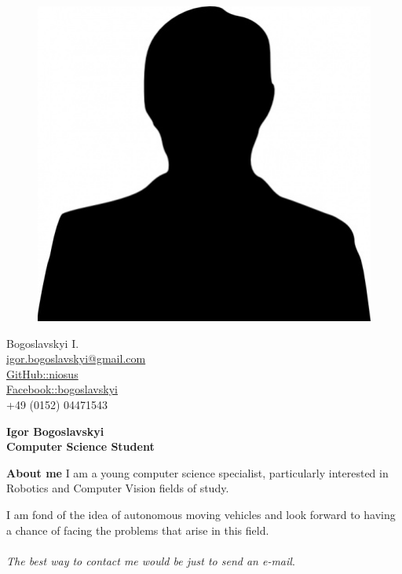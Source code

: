 \documentclass[a4paper,12pt,final]{memoir}
\newcommand{\Sep}{\vspace{1.5em}}
\newcommand{\SmallSep}{\vspace{0.5em}}
\newenvironment{AboutMe}
	{\ignorespaces\textbf{\color{Black} About me}}
	{\Sep\ignorespacesafterend}
\begin{document}
\begin{figure}
	\hfill
	\includegraphics[width=0.6\columnwidth]{photo.jpg}
	\vspace{-7cm}
\end{figure}

\begin{flushright}\small
	Bogoslavskyi I. \\
	\href{mailto:igor.bogoslavskyi@gmail.com}{igor.bogoslavskyi@gmail.com}\\ 
	\SmallSep
	\href{https://github.com/niosus}{GitHub::niosus}\\ 
	\SmallSep
	\href{https://www.facebook.com/bogoslavskyi}{Facebook::bogoslavskyi}\\ 
	\SmallSep
	+49 (0152) 04471543
\end{flushright}\normalsize
\framebreak


\Huge\bfseries {\color{MidnightBlue} Igor Bogoslavskyi} \\
\Large\bfseries  Computer Science Student \\

\normalsize\normalfont

\begin{AboutMe}
\newline 
I am a young computer science specialist, particularly interested in Robotics and Computer Vision fields of study. 

I am fond of the idea of autonomous moving vehicles and look forward to having a chance of facing the problems that arise in this field. \\
\\ \emph{The best way to contact me would be just to send an e-mail}.
\end{AboutMe}
\end{document}
